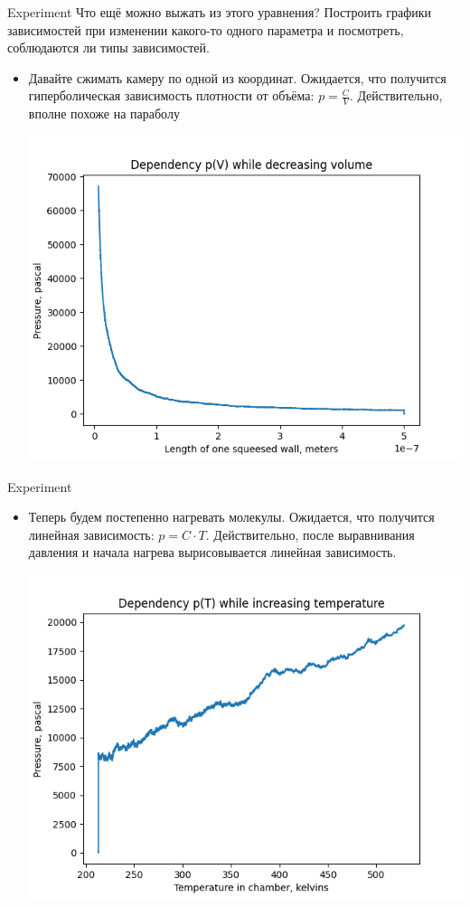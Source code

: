 \documentclass{beamer}
\begin{document}
\begin{frame}{Experiment}
  Что ещё можно выжать из этого уравнения? Построить графики зависимостей при изменении какого-то одного параметра и посмотреть, соблюдаются ли типы зависимостей.
  \begin{itemize}
    \item Давайте сжимать камеру по одной из координат. Ожидается, что получится гиперболическая зависимость плотности от объёма: $p = \frac{C}{V}$. Действительно, вполне похоже на параболу
    
    \includegraphics[scale=0.3]{pv.png}
  \end{itemize}
\end{frame}

\begin{frame}{Experiment}
  \begin{itemize}    
    \item Теперь будем постепенно нагревать молекулы. Ожидается, что получится линейная зависимость: $p = C\cdot T$. Действительно, после выравнивания давления и начала нагрева вырисовывается линейная зависимость.
    
    \includegraphics[scale=0.3]{pt.png}
  \end{itemize}
\end{frame}
\end{document}
